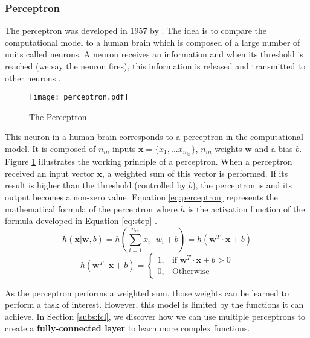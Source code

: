 \subsubsection{Perceptron} \label{subs:perceptron}
The perceptron was developed in 1957 by \textcite{rosenblatt_perceptron_1958}. The idea is to compare the computational model to a human brain which is composed of a large number of units called neurons. A neuron receives an information and when its threshold is reached (we say the neuron fires), this information is released and transmitted to other neurons \cite{rosenblatt_perceptron_1958, matteucci_artificial_2019}.

\begin{figure}
    \centering
    \texttt{[image: perceptron.pdf]}
    \caption{The Perceptron}
    \label{fig:perceptron}
\end{figure}
%
This neuron in a human brain corresponds to a perceptron in the computational model. It is composed of $n_{in}$ inputs $\boldsymbol{x} = \{ x_1, ... x_{n_{in}} \}$, $n_{in}$ weights $\boldsymbol{w}$ and a bias $b$. Figure \ref{fig:perceptron} illustrates the working principle of a perceptron. When a perceptron received an input vector $\boldsymbol{x}$, a weighted sum of this vector is performed. If its result is higher than the threshold (controlled by $b$), the perceptron is  and its output becomes a non-zero value.
Equation \ref{eq:perceptron} represents the mathematical formula of the perceptron where $h$ is the activation function of the formula developed in Equation \ref{eq:step} \cite{matteucci_artificial_2019}.
%
\begin{equation}
    h ( \boldsymbol{x} | \boldsymbol{w}, b) = h \left( \sum^{n_{in}}_{i=1} x_i \cdot w_i + b \right) = h \left( \boldsymbol{w}^{T} \cdot \boldsymbol{x} + b \right)
    \label{eq:perceptron}
\end{equation}
%
\begin{equation}
    h ( \boldsymbol{w}^{T} \cdot \boldsymbol{x} + b) = \begin{cases} 1, & \mbox{if } \boldsymbol{w}^{T} \cdot \boldsymbol{x} + b > 0 \\ 0, & \mbox{Otherwise} \end{cases}
    \label{eq:step}
\end{equation}

As the perceptron performs a weighted sum, those weights can be learned to perform a task of interest. However, this model is limited by the functions it can achieve. In Section \ref{subs:fcl}, we discover how we can use multiple perceptrons to create a \textbf{fully-connected layer} to learn more complex functions.
